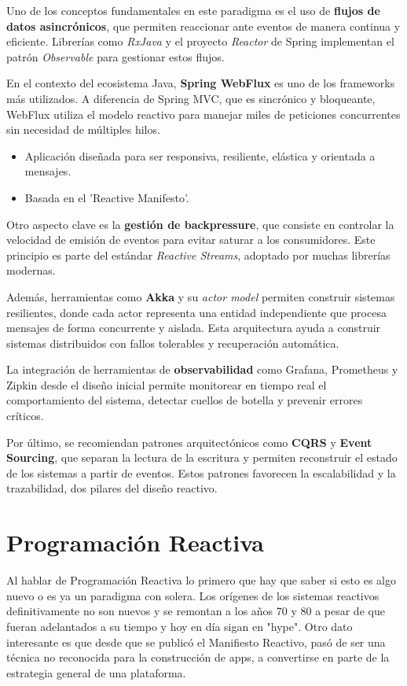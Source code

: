 \documentclass[12pt]{article}
\begin{document}
Uno de los conceptos fundamentales en este paradigma es el uso de \textbf{flujos de datos asincrónicos}, que permiten reaccionar ante eventos de manera continua y eficiente. Librerías como \textit{RxJava} y el proyecto \textit{Reactor} de Spring implementan el patrón \textit{Observable} para gestionar estos flujos.

En el contexto del ecosistema Java, \textbf{Spring WebFlux} es uno de los frameworks más utilizados. A diferencia de Spring MVC, que es sincrónico y bloqueante, WebFlux utiliza el modelo reactivo para manejar miles de peticiones concurrentes sin necesidad de múltiples hilos.

\begin{itemize}
    \item Aplicación diseñada para ser responsiva, resiliente, elástica y orientada a mensajes.
\end{itemize}
\begin{itemize}
    \item Basada en el 'Reactive Manifesto'.
\end{itemize}


Otro aspecto clave es la \textbf{gestión de backpressure}, que consiste en controlar la velocidad de emisión de eventos para evitar saturar a los consumidores. Este principio es parte del estándar \textit{Reactive Streams}, adoptado por muchas librerías modernas.

Además, herramientas como \textbf{Akka} y su \textit{actor model} permiten construir sistemas resilientes, donde cada actor representa una entidad independiente que procesa mensajes de forma concurrente y aislada. Esta arquitectura ayuda a construir sistemas distribuidos con fallos tolerables y recuperación automática.

La integración de herramientas de \textbf{observabilidad} como Grafana, Prometheus y Zipkin desde el diseño inicial permite monitorear en tiempo real el comportamiento del sistema, detectar cuellos de botella y prevenir errores críticos.

Por último, se recomiendan patrones arquitectónicos como \textbf{CQRS} y \textbf{Event Sourcing}, que separan la lectura de la escritura y permiten reconstruir el estado de los sistemas a partir de eventos. Estos patrones favorecen la escalabilidad y la trazabilidad, dos pilares del diseño reactivo.

\section*{Programación Reactiva}
Al hablar de Programación Reactiva lo primero que hay que saber si esto es algo nuevo o es ya un paradigma con solera. Los orígenes de los sistemas reactivos definitivamente no son nuevos y se remontan a los años 70 y 80 a pesar de que fueran adelantados a su tiempo y hoy en día sigan en "hype". Otro dato interesante es que desde que se publicó el Manifiesto Reactivo, pasó de ser una técnica no reconocida para la construcción de apps, a convertirse en parte de la estrategia general de una plataforma.
\end{document}
